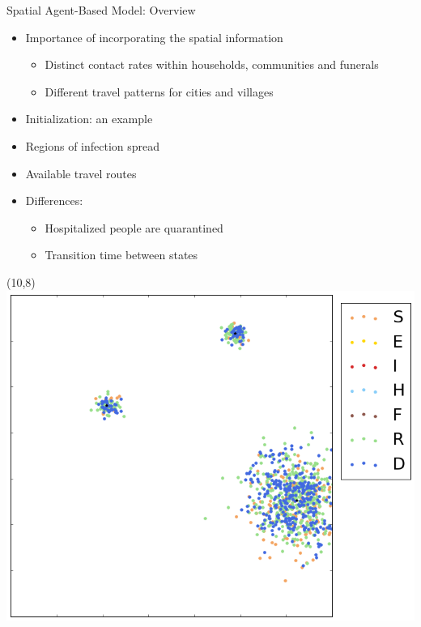 \documentclass[30pt]{beamer}
\begin{document}
\begin{frame}{Spatial Agent-Based Model: Overview}
\begin{itemize}
\item Importance of incorporating the spatial information
\begin{itemize}
\item Distinct contact rates within households, communities and funerals
\item Different travel patterns for cities and villages
\end{itemize}
\item Initialization: an example
\item Regions of infection spread
\item Available travel routes
\item Differences:
\begin{itemize}
\item Hospitalized people are quarantined
\item Transition time between states
\end{itemize}
\end{itemize}
\begin{textblock}{5.5}(10,8)
\includegraphics[width = 1\textwidth]{map.png}
\end{textblock}

\end{frame}
\end{document}
